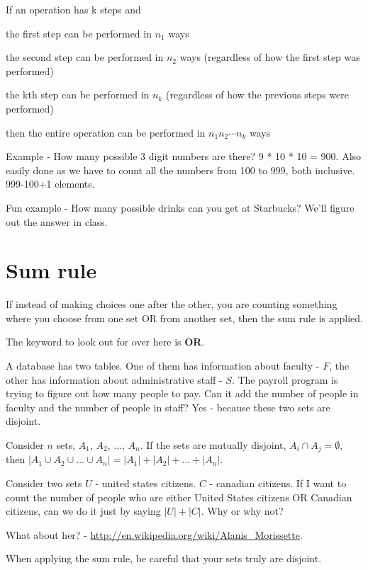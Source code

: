 \documentclass[12pt]{article}
\begin{document}
If an operation has k steps and 

the first step can be performed in $n_1$ ways

the second step can be performed in $n_2$ ways (regardless of how the first step was performed)

the kth step can be performed in $n_k$ (regardless of how the previous steps were performed)

then the entire operation can be performed in $n_1n_2 \cdots n_k$ ways

\vspace{0.7cm}

Example - How many possible 3 digit numbers are there? 9 * 10 * 10 = 900. Also easily done as we have to count all the numbers from 100 to 999, both inclusive. 999-100+1 elements.

Fun example - How many possible drinks can you get at Starbucks? We'll figure out the answer in class. 

\section*{Sum rule}

If instead of making choices one after the other, you are counting something where you choose from one set OR from another set, then the sum rule is applied.

The keyword to look out for over here is \textbf{OR}.

A database has two tables. One of them has information about faculty - $F$, the other has information about administrative staff - $S$. The payroll program is trying to figure out how many people to pay. Can it add the number of people in faculty and the number of people in staff? Yes - because these two sets are disjoint. 

Consider $n$ sets, $A_1$, $A_2$, ..., $A_n$. If the sets are mutually disjoint, $A_i \cap A_j = \emptyset$, then 
$|A_1 \cup A_2 \cup \ldots \cup A_n| = |A_1| + |A_2| + \ldots + |A_n|$. 

Consider two sets $U$ - united states citizens. $C$ - canadian citizens. If I want to count the number of people who are either United States citizens OR Canadian citizens, can we do it just by saying $|U| + |C|$. Why or why not?

What about her? - \href{http://en.wikipedia.org/wiki/Alanis\_Morissette}{http://en.wikipedia.org/wiki/Alanis\_Morissette}.

When applying the sum rule, be careful that your sets truly are disjoint.
\end{document}
